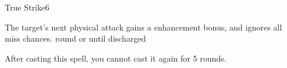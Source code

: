 \begin{spellsection}{True Strike}{6}
\begin{spellheader}
    \spellrng{\rngmed}
    \begin{spelltargetinginfo}
    \end{spelltargetinginfo}
\end{spellheader}
\begin{spellcontent}
    \begin{spelleffects}
        \spelleffect The target's next physical attack gains a  enhancement bonus, and ignores all miss chances. 
         round or until discharged
    \end{spelleffects}
\end{spellcontent}
\begin{spellfooter}
    \spellnotes After casting this spell, you cannot cast it again for 5 rounds.
\end{spellfooter}

\begin{comment}
\subsubsection{U-Z}
\end{comment}
\end{spellsection}

